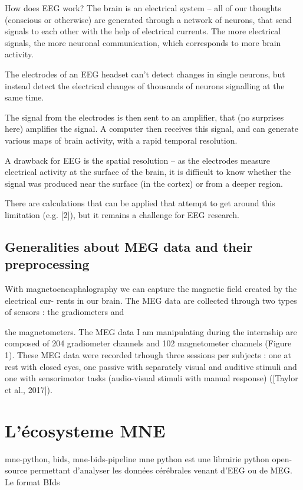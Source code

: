 How does EEG work?
The brain is an electrical system – all of our thoughts (conscious or otherwise) are generated through a network of neurons, that send signals to each other with the help of electrical currents. The more electrical signals, the more neuronal communication, which corresponds to more brain activity.

The electrodes of an EEG headset can’t detect changes in single neurons, but instead detect the electrical changes of thousands of neurons signalling at the same time.

The signal from the electrodes is then sent to an amplifier, that (no surprises here) amplifies the signal. A computer then receives this signal, and can generate various maps of brain activity, with a rapid temporal resolution.

A drawback for EEG is the spatial resolution – as the electrodes measure electrical activity at the surface of the brain, it is difficult to know whether the signal was produced near the surface (in the cortex) or from a deeper region.

There are calculations that can be applied that attempt to get around this limitation (e.g. [2]), but it remains a challenge for EEG research.


\subsection{Generalities about MEG data and their preprocessing}

With magnetoencaphalography we can capture the magnetic field created by the electrical cur-
rents in our brain. The MEG data are collected through two types of sensors : the gradiometers and

the magnetometers. The MEG data I am manipulating during the internship are composed of 204
gradiometer channels and 102 magnetometer channels (Figure 1). These MEG data were recorded
trhough three sessions per subjects : one at rest with closed eyes, one passive with separately visual
and auditive stimuli and one with sensorimotor tasks (audio-visual stimuli with manual response)
([Taylor et al., 2017]).


\section{L'écosysteme MNE}


mne-python, bids, mne-bids-pipeline
mne python est une librairie python open-source permettant d'analyser les données cérébrales venant d'EEG ou de MEG. Le format BIds


